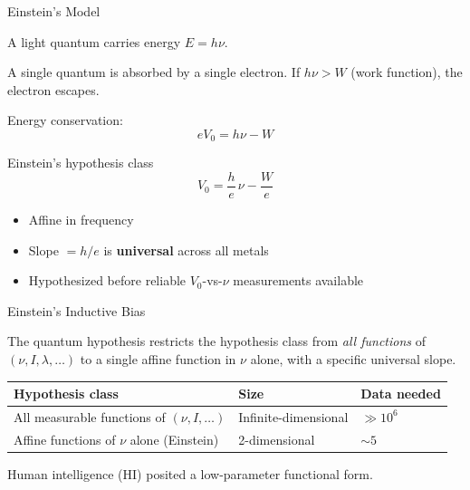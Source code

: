 \documentclass[aspectratio=169]{beamer}
\begin{document}
\begin{frame}{Einstein's Model}

A light quantum carries energy $E = h\nu$.

\medskip
A single quantum is absorbed by a single electron.
If $h\nu > W$ (work function), the electron escapes.

\medskip
Energy conservation:
\[
  eV_0 = h\nu - W
\]

\medskip
\begin{block}{Einstein's hypothesis class}
\[
  V_0 = \frac{h}{e}\,\nu - \frac{W}{e}
\]
\begin{itemize}
  \item Affine in frequency
  \item Slope $= h/e$ is \textbf{universal} across all metals
  \item Hypothesized before  reliable $V_0$-vs-$\nu$ measurements available
\end{itemize}
\end{block}

\end{frame}

\begin{frame}{Einstein's Inductive Bias}

The quantum hypothesis restricts the hypothesis class from \emph{all
functions} of $(\nu, I, \lambda, \ldots)$ to a single affine
function in $\nu$ alone, with a specific universal slope.

\bigskip
\begin{center}
\begin{tabular}{lll}
\toprule
Hypothesis class & Size & Data needed \\
\midrule
All measurable functions of $(\nu, I, \ldots)$ & Infinite-dimensional & $\gg 10^6$ \\
Affine functions of $\nu$ alone (Einstein) & 2-dimensional & $\sim 5$ \\
\bottomrule
\end{tabular}
\end{center}

\bigskip
Human intelligence (HI)  posited a low-parameter functional form.

\end{frame}
\end{document}
